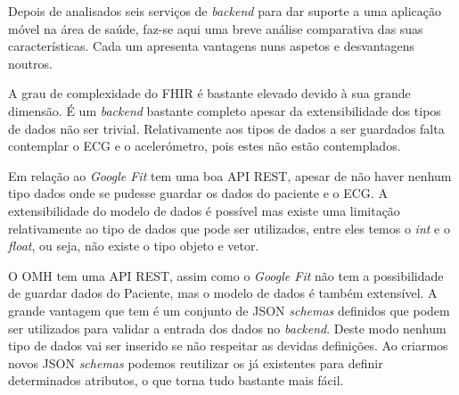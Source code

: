 Depois de analisados seis serviços de \textit{backend} para dar suporte a uma aplicação móvel na área de saúde, faz-se aqui uma breve análise comparativa das suas características. Cada um apresenta vantagens nuns aspetos e desvantagens noutros.
\par 
A grau de complexidade do \gls{FHIR} é bastante elevado devido à sua grande dimensão. É um \textit{backend} bastante completo apesar da extensibilidade dos tipos de dados não ser trivial. Relativamente aos tipos de dados a ser guardados falta contemplar o \gls{ECG} e o acelerómetro, pois estes não estão contemplados.
\par 
Em relação ao \textit{Google Fit} tem uma boa \gls{API} \gls{REST}, apesar de não haver nenhum tipo dados onde se pudesse guardar os dados do paciente e o \gls{ECG}. A extensibilidade do modelo de dados é possível mas existe uma limitação relativamente ao tipo de dados que pode ser utilizados, entre eles temos o \textit{int} e o \textit{float}, ou seja, não existe o tipo objeto e vetor.
\par 
O \gls{OMH} tem uma \gls{API} \gls{REST}, assim como o \textit{Google Fit} não tem a possibilidade de guardar dados do Paciente, mas o modelo de dados é também extensível. A grande vantagem que tem é um conjunto de \gls{JSON} \textit{schemas} definidos que podem ser utilizados para validar a entrada dos dados no \textit{backend}. Deste modo nenhum tipo de dados vai ser inserido se não respeitar as devidas definições. Ao criarmos novos \gls{JSON} \textit{schemas} podemos reutilizar os já existentes para definir determinados atributos, o que torna tudo bastante mais fácil.


\cleardoublepage